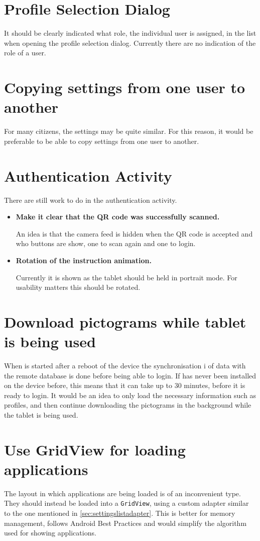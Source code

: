 \section{Profile Selection Dialog}
It should be clearly indicated what role, the individual user is assigned, in the list when opening the profile selection dialog.
Currently there are no indication of the role of a user.

\section{Copying settings from one user to another}
For many citizens, the settings may be quite similar.
For this reason, it would be preferable to be able to copy settings from one user to another.

\section{Authentication Activity}
There are still work to do in the authentication activity.

\begin{itemize}
	\item \textbf{Make it clear that the QR code was successfully scanned.}

	An idea is that the camera feed is hidden when the QR code is accepted and who buttons are show, one to scan again and one to login.
	\item \textbf{Rotation of the instruction animation.}

	Currently it is shown as the tablet should be held in portrait mode. 
	For usability matters this should be rotated. 
\end{itemize}

\section{Download pictograms while tablet is being used}
When \launcher is started after a reboot of the device the synchronisation i of data with the remote database is done before being able to login.
If \launcher has never been installed on the device before, this means that it can take up to 30 minutes, before it is ready to login.
It would be an idea to only load the necessary information such as profiles, and then continue downloading the pictograms in the background while the tablet is being used.

\section{Use GridView for loading applications}
The layout in which applications are being loaded is of an inconvenient type. 
They should instead be loaded into a \lstinline|GridView|, using a custom adapter similar to the one mentioned in \cref{sec:settingslistadapter}. 
This is better for memory management, follows Android Best Practices and would simplify the algorithm used for showing applications. 